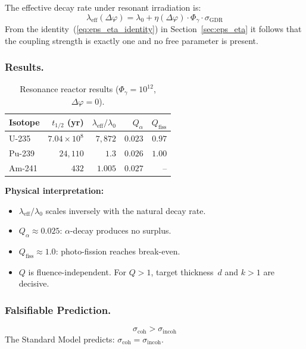 \documentclass[12pt]{iopart}
\begin{document}
	The effective decay rate under resonant irradiation is:
	\begin{equation}
		\lambda_{\mathrm{eff}}(\Delta\varphi)
		= \lambda_0
		+ \eta(\Delta\varphi) \cdot \Phi_\gamma
		\cdot \sigma_{\mathrm{GDR}}
		\label{eq:lambda_eff}
	\end{equation}
	From the identity~(\ref{eq:eps_eta_identity}) in
	Section~\ref{sec:eps_eta} it follows that the coupling
	strength is exactly one and no free parameter is present.
	
	\subsubsection{Results.}
	
	\begin{table}[ht]
		\centering
		\caption{Resonance reactor results
			($\Phi_\gamma = 10^{12}$,
			$\Delta\varphi = 0$).}
		\label{tab:reaktor}
		\begin{tabular}{lrrrr}
			\hline
			Isotope & $t_{1/2}$ (yr)
			& $\lambda_{\mathrm{eff}}/\lambda_0$
			& $Q_\alpha$
			& $Q_{\mathrm{fiss}}$ \\
			\hline
			U-235 & $7.04 \times 10^8$
			& $7{,}872$ & $0.023$ & $0.97$ \\
			Pu-239 & $24{,}110$
			& $1.3$ & $0.026$ & $1.00$ \\
			Am-241 & $432$
			& $1.005$ & $0.027$ & -- \\
			\hline
		\end{tabular}
	\end{table}
	
	\textbf{Physical interpretation:}
	\begin{itemize}
		\item $\lambda_{\mathrm{eff}}/\lambda_0$
		scales inversely with the natural decay rate.
		\item $Q_\alpha \approx 0.025$:
		$\alpha$-decay produces no surplus.
		\item $Q_{\mathrm{fiss}} \approx 1.0$:
		photo-fission reaches break-even.
		\item $Q$ is fluence-independent.
		For $Q > 1$, target thickness~$d$ and
		$k > 1$ are decisive.
	\end{itemize}
	
	\subsubsection{Falsifiable Prediction.}
	\begin{equation}
		\sigma_{\mathrm{coh}}
		> \sigma_{\mathrm{incoh}}
		\label{eq:prediction}
	\end{equation}
	The Standard Model predicts:
	$\sigma_{\mathrm{coh}}
	= \sigma_{\mathrm{incoh}}$.
	
\end{document}
